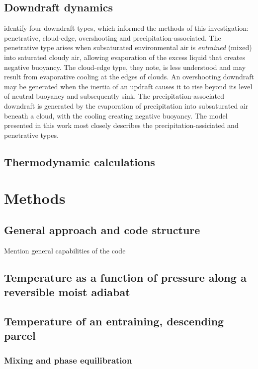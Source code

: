 \documentclass[12pt,titlepage]{article}
\begin{document}
\subsection{Downdraft dynamics}
\textcite{knupp_cotton_1985} identify four downdraft types, which
informed the methods of this investigation: penetrative, cloud-edge,
overshooting and precipitation-associated.
The penetrative type arises when subsaturated environmental air
is \emph{entrained} (mixed) into saturated cloudy air, allowing
evaporation of the excess liquid that creates negative buoyancy.
The cloud-edge type, they note, is less understood and may result
from evaporative cooling at the edges of clouds.
An overshooting downdraft may be generated when the inertia of
an updraft causes it to rise beyond its level of neutral buoyancy
and subsequently sink.
The precipitation-associated downdraft is generated by the evaporation
of precipitation into subsaturated air beneath a cloud, with the cooling
creating negative buoyancy. The model presented in this work most
closely describes the precipitation-assiciated and penetrative types.


\subsection{Thermodynamic calculations}


\section{Methods}

\subsection{General approach and code structure}
Mention general capabilities of the code

\subsection{%
	Temperature as a function of pressure along a reversible moist adiabat}


\subsection{Temperature of an entraining, descending parcel}
\subsubsection*{Mixing and phase equilibration}
\end{document}
